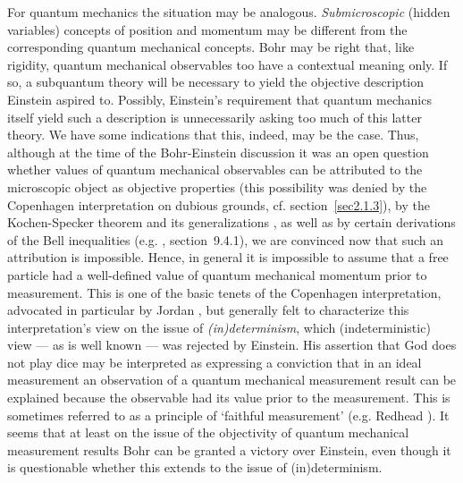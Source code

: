 \documentclass[12pt]{article}
\begin{document}
For quantum mechanics the situation may be analogous. {\em
Submicroscopic} (hidden variables) concepts of position and
momentum may be different from the corresponding quantum
mechanical concepts. Bohr may be right that, like rigidity,
quantum mechanical observables too have a contextual meaning only.
If so, a subquantum theory will be necessary to yield the
objective description Einstein aspired to. Possibly, Einstein's
requirement that quantum mechanics itself yield such a description
is unnecessarily asking too much of this latter theory. We have
some indications that this, indeed, may be the case. Thus,
although at the time of the Bohr-Einstein discussion it was an
open question whether values of quantum mechanical observables can
be attributed to the microscopic object as objective properties
(this possibility was denied by the Copenhagen interpretation on
dubious grounds, cf. section~\ref{sec2.1.3}), by the
Kochen-Specker theorem and its generalizations
\cite{KS,Mermin90,Mermin90b,Peres91,Mermin93}, as well as by
certain derivations of the Bell inequalities (e.g. \cite{dM2002},
section~9.4.1), we are convinced now that such an attribution is
impossible. Hence, in general it is impossible to assume that a
free particle had a well-defined value of quantum mechanical
momentum prior to measurement. This is one of the basic tenets of
the Copenhagen interpretation, advocated in particular by Jordan
\cite{Jord34}, but generally felt to characterize this
interpretation's view on the issue of {\em (in)determinism}, which
(indeterministic) view --- as is well known --- was rejected by
Einstein. His assertion that God does not play dice may be
interpreted as expressing a conviction that in an ideal
measurement an observation of a quantum mechanical measurement
result can be explained because the observable had its value prior
to the measurement. This is sometimes referred to as a principle
of `faithful measurement' (e.g. Redhead \cite{Redhead}). It seems
that at least on the issue of the objectivity of quantum
mechanical measurement results Bohr can be granted a victory over
Einstein, even though it is questionable whether this extends to
the issue of (in)determinism.
\end{document}
